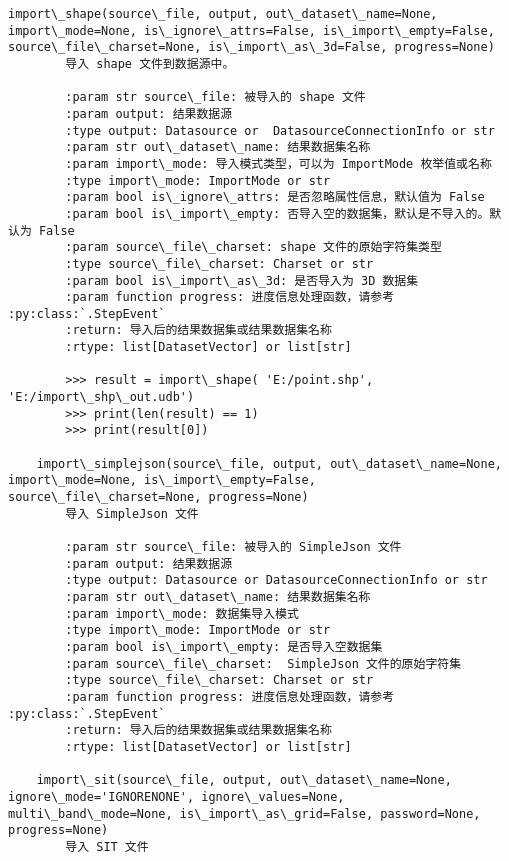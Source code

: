 \documentclass[11pt]{article}
\begin{document}
\begin{Verbatim}[commandchars=\\\{\}]
    import\_shape(source\_file, output, out\_dataset\_name=None, import\_mode=None, is\_ignore\_attrs=False, is\_import\_empty=False, source\_file\_charset=None, is\_import\_as\_3d=False, progress=None)
        导入 shape 文件到数据源中。
        
        :param str source\_file: 被导入的 shape 文件
        :param output: 结果数据源
        :type output: Datasource or  DatasourceConnectionInfo or str
        :param str out\_dataset\_name: 结果数据集名称
        :param import\_mode: 导入模式类型，可以为 ImportMode 枚举值或名称
        :type import\_mode: ImportMode or str
        :param bool is\_ignore\_attrs: 是否忽略属性信息，默认值为 False
        :param bool is\_import\_empty: 否导入空的数据集，默认是不导入的。默认为 False
        :param source\_file\_charset: shape 文件的原始字符集类型
        :type source\_file\_charset: Charset or str
        :param bool is\_import\_as\_3d: 是否导入为 3D 数据集
        :param function progress: 进度信息处理函数，请参考 :py:class:`.StepEvent`
        :return: 导入后的结果数据集或结果数据集名称
        :rtype: list[DatasetVector] or list[str]
        
        >>> result = import\_shape( 'E:/point.shp', 'E:/import\_shp\_out.udb')
        >>> print(len(result) == 1)
        >>> print(result[0])
    
    import\_simplejson(source\_file, output, out\_dataset\_name=None, import\_mode=None, is\_import\_empty=False, source\_file\_charset=None, progress=None)
        导入 SimpleJson 文件
        
        :param str source\_file: 被导入的 SimpleJson 文件
        :param output: 结果数据源
        :type output: Datasource or DatasourceConnectionInfo or str
        :param str out\_dataset\_name: 结果数据集名称
        :param import\_mode: 数据集导入模式
        :type import\_mode: ImportMode or str
        :param bool is\_import\_empty: 是否导入空数据集
        :param source\_file\_charset:  SimpleJson 文件的原始字符集
        :type source\_file\_charset: Charset or str
        :param function progress: 进度信息处理函数，请参考 :py:class:`.StepEvent`
        :return: 导入后的结果数据集或结果数据集名称
        :rtype: list[DatasetVector] or list[str]
    
    import\_sit(source\_file, output, out\_dataset\_name=None, ignore\_mode='IGNORENONE', ignore\_values=None, multi\_band\_mode=None, is\_import\_as\_grid=False, password=None, progress=None)
        导入 SIT 文件
        

\end{Verbatim}
\end{document}
